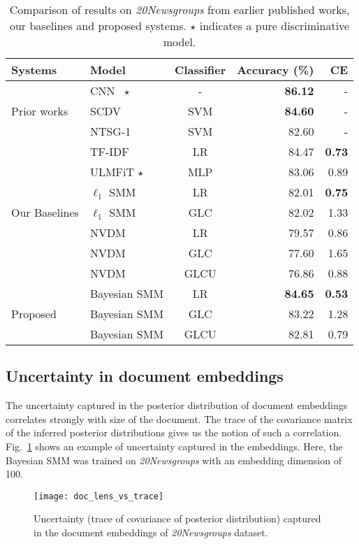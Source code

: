 \documentclass[journal]{IEEEtran}
\begin{document}
\begin{table}[!t]
	\begin{center}
		\caption{\label{tab:res2}Comparison of results on 
		\textit{20Newsgroups} from earlier published works, our baselines and 
		proposed systems. \(\star\) indicates a pure discriminative model.}
		\begin{tabular}{llcrr} \toprule
 		\bf{Systems} & \bf{Model} & \bf{Classifier} & \bf{Accuracy (\%)} & \bf{CE} \\
		\midrule
  \multirow{3}{*}{Prior works} & CNN~\cite{Raghu:2018:CNN} \(\star\) & 
  	- & \textbf{86.12} 	& - \\
 & SCDV~\cite{Mekala:2017:SCDV} & SVM  &  \textbf{84.60} & - \\
 &	NTSG-1~\cite{Liu:2015:NTSG} & SVM  &  82.60 & -  \\ \midrule
 \multirow{7}{*}{Our Baselines} & TF-IDF   & LR  & 84.47 & \textbf{0.73}  \\
 & ULMFiT \(\star\) & MLP  & 83.06 & 0.89 \\ \cmidrule{2-5}
 &	\(\ell_1\) SMM  & LR   & 82.01 & \textbf{0.75} \\
 &	\(\ell_1\) SMM  & GLC  & 82.02 &  1.33 \\  \cmidrule{2-5}
 & NVDM             & LR   & 79.57 & 0.86 \\
 & NVDM             & GLC  & 77.60 & 1.65\\
 & NVDM             & GLCU & 76.86 & 0.88 \\	\midrule
 \multirow{3}{*}{Proposed} & Bayesian SMM & LR & \textbf{84.65} & \textbf{0.53} 
 \\
 & Bayesian SMM           & GLC    &  83.22 & 1.28 \\
 & Bayesian SMM           & GLCU   &  82.81 & 0.79 \\
	\bottomrule
 \end{tabular}
 \end{center}
\end{table}
\subsection{Uncertainty in document embeddings}
\label{ssec:uncert}
The uncertainty captured in the posterior distribution of document embeddings
correlates strongly with size of the document. The trace of the covariance matrix of the inferred posterior distributions gives us the notion of such a correlation. Fig.~\ref{fig:trace} shows an example of uncertainty captured in
the embeddings. Here, the Bayesian SMM was trained on \textit{20Newsgroups} 
with an embedding dimension of 100. 
\begin{figure}[ht!]
	\centering
	\texttt{[image: doc\_lens\_vs\_trace]}
	\caption{\label{fig:trace} Uncertainty (trace of covariance of posterior 
		distribution) captured in the document embeddings of 
		\textit{20Newsgroups} dataset.}
\end{figure}
\end{document}
